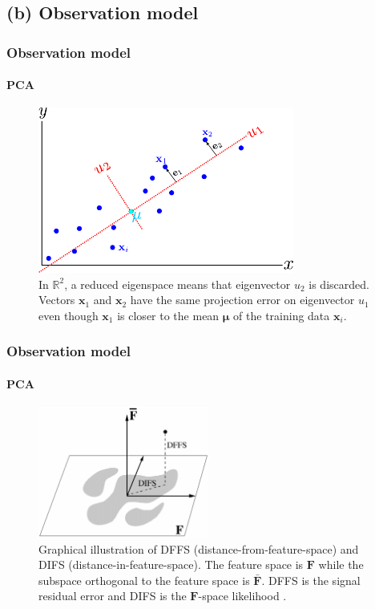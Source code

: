 \subsection{(b) Observation model}
\begin{frame}
\frametitle{Observation model}
\framesubtitle{PCA}
\logoCSIPCPL\mypagenum
\begin{figure}
\centering
\includegraphics[width=0.75\textwidth]{thesis/PRML_PCA_problem.pdf}
\caption{In $\mathbb{R}^2$, a reduced eigenspace means that eigenvector $u_2$ is discarded.  Vectors $\mathbf{x}_1$ and $\mathbf{x}_2$ have the same projection error on eigenvector $u_1$ even though $\mathbf{x}_1$ is closer to the mean $\boldsymbol\mu$ of the training data $\mathbf{x}_i$.}
\label{fig:PRML_PCA_problem}
\end{figure}
\end{frame}


\begin{frame}
\frametitle{Observation model}
\framesubtitle{PCA}
\logoCSIPCPL\mypagenum
\begin{figure}[t]
\centering
\includegraphics[width=0.5\textwidth]{thesis/1998_JNL_ProbVisLearning_Moghaddam_fig3.png}
\caption{Graphical illustration of DFFS (distance-from-feature-space) and DIFS (distance-in-feature-space).  The feature space is $\mathbf{F}$ while the subspace orthogonal to the feature space is $\bar{\mathbf{F}}$.  DFFS is the signal residual error and DIFS is the $\mathbf{F}$-space likelihood \cite{1997_JNL_EigenTRK_Moghaddam}.}
\label{fig:1997_JNL_DIFSDFFS_Moghaddam}
\end{figure}
\end{frame}


